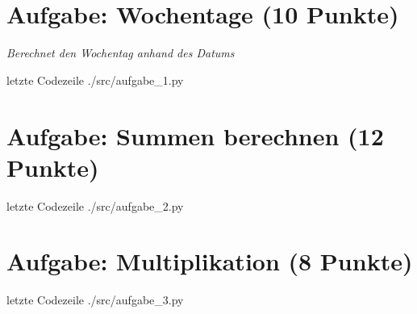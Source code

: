 
\newcommand{\dozent}{Prof. Dr. Claudia Müller-Birn, Barry Linnert}					%
\newcommand{\tutor}{Thierry Meurers}						%
\newcommand{\tutoriumNo}{10}				%
\newcommand{\ubungNo}{01}									%
\newcommand{\veranstaltung}{Objektorientierte Programmierung}	%
\newcommand{\semester}{SoSe 17}						%
\newcommand{\studenten}{Stefaan Hessmann, Jaap Pedersen, Mark Niehues}			%




\section{Aufgabe: Wochentage \hfill (10 Punkte)}
{\itshape Berechnet den Wochentag anhand des Datums}

 letzte Codezeile
{./src/aufgabe_1.py}


\section{Aufgabe: Summen berechnen \hfill (12 Punkte)}
 letzte Codezeile
{./src/aufgabe_2.py}

\section{Aufgabe: Multiplikation \hfill (8 Punkte)}

 letzte Codezeile
{./src/aufgabe_3.py}

